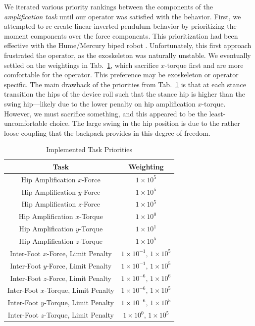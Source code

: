 \documentclass[utf8]{frontiersSCNS}
\renewcommand*{\cite}[1]{\citep{#1}}
\begin{document}
We iterated various priority rankings between the components of the \emph{amplification task} until our operator was satisfied with the behavior.
First, we attempted to re-create linear inverted pendulum behavior by prioritizing the moment components over the force components. This prioritization had been effective with the Hume/Mercury biped robot \cite{KimEA2016TRO,KimJorgensenSentis2020IJRR}. %
Unfortunately, this first approach frustrated the operator, as the exoskeleton was naturally unstable.
We eventually settled on the weightings in Tab.~\ref{tab:priorities}, which sacrifice $x$-torque first and are more comfortable for the operator.
This preference may be exoskeleton or operator specific.
The main drawback of the priorities from Tab.~\ref{tab:priorities} is that at each stance transition the hips of the device roll such that the stance hip is higher than the swing hip---likely due to the lower penalty on hip amplification $x$-torque.
However, we must sacrifice something, and this appeared to be the least-uncomfortable choice. The large swing in the hip position is due to the rather loose coupling that the backpack provides in this degree of freedom.



\begin{table}[tb]\centering
	\begin{tabular}{cc}
		\toprule
		Task & Weighting\\
		\midrule
		Hip Amplification $x$-Force & $1\times 10^{5}$\\
		Hip Amplification $y$-Force & $1\times 10^{5}$\\
		Hip Amplification $z$-Force & $1\times 10^{5}$\\
		Hip Amplification $x$-Torque & $1\times 10^{0}$\\
		Hip Amplification $y$-Torque & $1\times 10^{1}$\\
		Hip Amplification $z$-Torque & $1\times 10^{5}$\\
		Inter-Foot $x$-Force, Limit Penalty& $1\times 10^{-1}$, $1\times 10^{5}$\\
		Inter-Foot $y$-Force, Limit Penalty & $1\times 10^{-1}$, $1\times 10^{5}$\\
		Inter-Foot $z$-Force, Limit Penalty & $1\times 10^{-6}$, $1\times 10^{6}$\\
		Inter-Foot $x$-Torque, Limit Penalty & $1\times 10^{-6}$, $1\times 10^{5}$\\
		Inter-Foot $y$-Torque, Limit Penalty & $1\times 10^{-6}$, $1\times 10^{5}$\\
		Inter-Foot $z$-Torque, Limit Penalty & $1\times 10^{0}$, $1\times 10^{5}$\\
		\bottomrule
	\end{tabular}
	\caption{Implemented Task Priorities}\label{tab:priorities}
\end{table}
\end{document}
